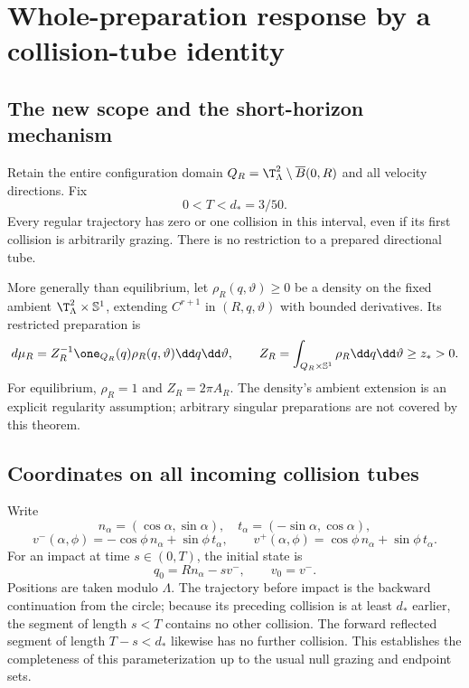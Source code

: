 \section{Whole-preparation response by a collision-tube identity}\label{sec:lorentz-global}
\subsection{The new scope and the short-horizon mechanism}
Retain the entire configuration domain $Q_R=\T_\Lambda^2\setminus\overline B(0,R)$ and all velocity directions. Fix
\begin{equation}
 0<T<d_*=3/50.
 \label{eq:short-T}
\end{equation}
Every regular trajectory has zero or one collision in this interval, even if its first collision is arbitrarily grazing. There is no restriction to a prepared directional tube.

More generally than equilibrium, let $\rho_R(q,\vartheta)\ge0$ be a density on the fixed ambient $\T_\Lambda^2\times\mathbb S^1$, extending $C^{r+1}$ in $(R,q,\vartheta)$ with bounded derivatives. Its restricted preparation is
\[
 d\mu_R=Z_R^{-1}\one_{Q_R}(q)\rho_R(q,\vartheta)\dd q\dd\vartheta,
 \qquad Z_R=\int_{Q_R\times\mathbb S^1}\rho_R\dd q\dd\vartheta\ge z_*>0.
\]
For equilibrium, $\rho_R=1$ and $Z_R=2\pi A_R$. The density's ambient extension is an explicit regularity assumption; arbitrary singular preparations are not covered by this theorem.

\subsection{Coordinates on all incoming collision tubes}
Write
\[
 n_\alpha=(\cos\alpha,\sin\alpha),\quad
 t_\alpha=(-\sin\alpha,\cos\alpha),
\]
\[
 v^-(\alpha,\phi)=-\cos\phi\,n_\alpha+\sin\phi\,t_\alpha,
 \qquad v^+(\alpha,\phi)=\cos\phi\,n_\alpha+\sin\phi\,t_\alpha.
\]
For an impact at time $s\in(0,T)$, the initial state is
\begin{equation}
 q_0=Rn_\alpha-sv^-,\qquad v_0=v^-.
 \label{eq:incoming-tube}
\end{equation}
Positions are taken modulo $\Lambda$. The trajectory before impact is the backward continuation from the circle; because its preceding collision is at least $d_*$ earlier, the segment of length $s<T$ contains no other collision. The forward reflected segment of length $T-s<d_*$ likewise has no further collision. This establishes the completeness of this parameterization up to the usual null grazing and endpoint sets.

